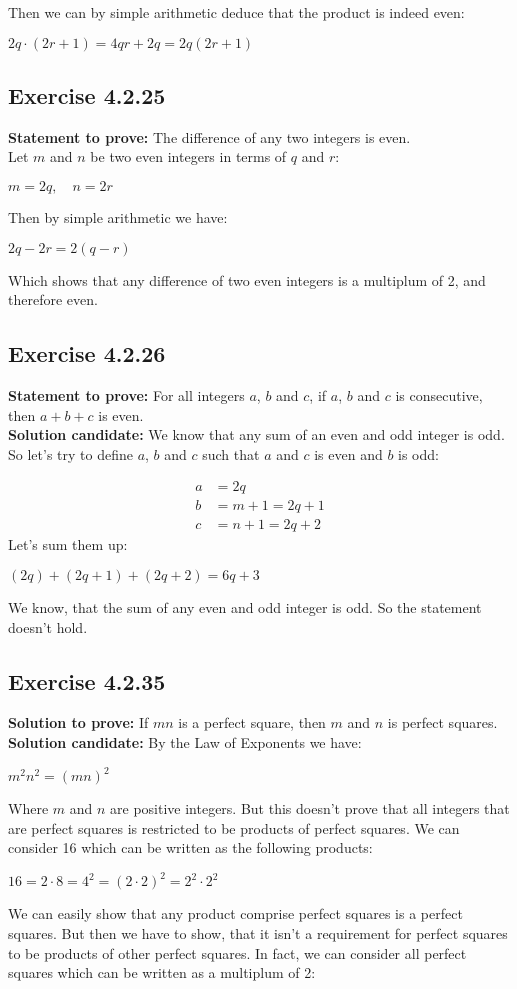 \documentclass{report}
\newcommand{\cent}[1]{\begin{center}#1\end{center}}
\newcommand{\mAlign}[1]{\begin{align*}#1\end{align*}}
\newcommand{\Prove}{\textbf{Statement to prove: }}
\newcommand{\solution}{\textbf{Solution candidate: }}
\newcommand{\QED}{\boxed{}}
\newcommand{\Exercise}[1]{\subsection{Exercise #1}}
\begin{document}
	Then we can by simple arithmetic deduce that the product is indeed even:
	
	\cent{$ 2q \cdot (2r+1) = 4qr+2q = 2q(2r+1) $}
	
	\QED
	
	\Exercise{4.2.25}
	
	\Prove
	The difference of any two integers is even.\\
	
	Let $m$ and $n$ be two even integers in terms of $q$ and $r$: 
	
	\cent{$m = 2q, \quad n = 2r$}
	
	Then by simple arithmetic we have:
	\cent{$2q - 2r = 2(q-r)$}
	
	Which shows that any difference of two even integers is a multiplum of 2, and therefore even.
	\QED
	
	\Exercise{4.2.26}
	\Prove
	For all integers $a$, $b$ and $c$, if $a$, $b$ and $c$ is consecutive, then $a+b+c$ is even.\\
	
	\solution
	We know that any sum of an even and odd integer is odd. So let's try to define $a$, $b$ and $c$ such that $a$ and $c$ is even and $b$ is odd:
	
	\mAlign{a &= 2q\\
					b &= m + 1 = 2q+1 \\
					c &= n + 1 = 2q+2}
	Let's sum them up:
	
	\cent{$(2q) + (2q+1) + (2q+2) = 6q+3$}
	
	We know, that the sum of any even and odd integer is odd. So the statement doesn't hold.
	
	\QED
	
	\Exercise{4.2.35}
	\textbf{Solution to prove:}
	If $mn$ is a perfect square, then $m$ and $n$ is perfect squares.\\
	
	\solution
	By the Law of Exponents we have:
	\cent{$ m^2 n^2=(mn)^2$}
	
	Where $m$ and $n$ are positive integers. But this doesn't prove that all integers that are perfect squares is restricted to be products of perfect squares. We can consider 16 which can be written as the following products:
	
	\cent{$16 = 2 \cdot 8 = 4^2 = (2 \cdot 2)^2 = 2^2 \cdot 2^2$}
	
	We can easily show that any product comprise perfect squares is a perfect squares. But then we have to show, that it isn't a requirement for perfect squares to be products of other perfect squares. In fact, we can consider all perfect squares which can be written as a multiplum of 2:
	
\end{document}
